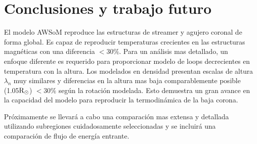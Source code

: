\documentclass[baaa]{baaa}
\begin{document}

\section{Conclusiones y trabajo futuro}

El modelo AWSoM reproduce las estructuras de streamer y agujero coronal de forma global. Es capaz de reproducir temperaturas crecientes en las estructuras magnéticas con una diferencia $<30 \%$. Para un análisis mas detallado, un enfoque diferente es requerido para proporcionar modelo de loops decrecientes en temperatura con la altura. Los modelados en densidad presentan escalas de altura $\lambda_n$ muy similares y diferencias en la altura mas baja comparablemente posible (1.05${\rm R_\odot}$) $<30 \%$ según la rotación modelada. Esto demuestra un gran avance en la capacidad del modelo para reproducir la termodinámica de la baja corona.

Próximamente se llevará a cabo una comparación mas extensa y detallada utilizando subregiones cuidadosamente seleccionadas y se incluirá una comparación de flujo de energía entrante.





\small

 
\end{document}
